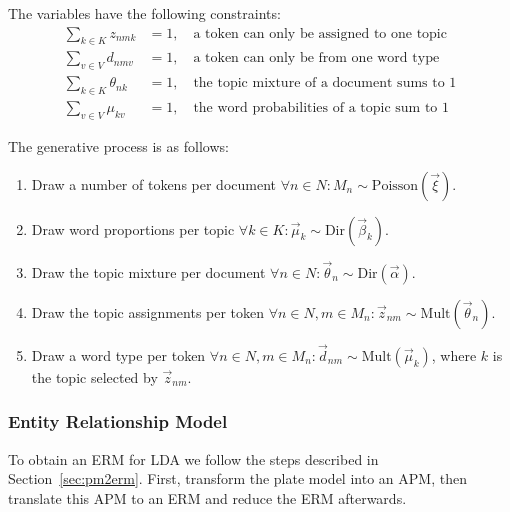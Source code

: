 The variables have the following constraints:
\begin{align}
\sum_{k \in K} z_{nmk} &= 1,\quad \text{a token can only be assigned to one topic}\\
\sum_{v \in V} d_{nmv} &= 1,\quad \text{a token can only be from one word type}\\
\sum_{k \in K} \theta_{nk} &= 1,\quad \text{the topic mixture of a document sums to 1}\\
\sum_{v \in V} \mu_{kv} &= 1,\quad \text{the word probabilities of a topic sum to 1}
\end{align}

The generative process is as follows:
\begin{enumerate}
\item Draw a number of tokens per document $\forall n \in N: M_n \sim \text{Poisson}(\vec \xi)$.
\item Draw word proportions per topic $\forall k \in K: \vec \mu_k \sim \text{Dir}(\vec \beta_k)$.
\item Draw the topic mixture per document $\forall n \in N: \vec \theta_n \sim \text{Dir}(\vec \alpha)$.
\item Draw the topic assignments per token $\forall n \in N, m \in M_n: \vec z_{nm} \sim \text{Mult}(\vec \theta_n)$.
\item Draw a word type per token $\forall n \in N, m \in M_n: \vec d_{nm} \sim \text{Mult}(\vec \mu_k)$, where $k$ is the topic selected by $\vec z_{nm}$.
\end{enumerate}

\subsubsection{Entity Relationship Model}

To obtain an ERM for LDA we follow the steps described in Section~\ref{sec:pm2erm}. First, transform the plate model into an APM, then translate this APM to an ERM and reduce the ERM afterwards.

